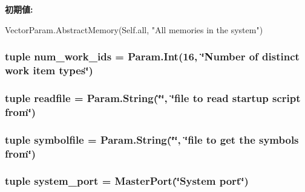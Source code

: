 \label{classSystem_1_1System_a0ebb0343c16ba35f99eb82a31a3abed7}
{\bfseries 初期値:}
\begin{DoxyCode}
VectorParam.AbstractMemory(Self.all,
                                          "All memories in the system")
\end{DoxyCode}
\hypertarget{classSystem_1_1System_a505fd78bb6593c92f840f452741a8c42}{
\subsubsection[{num\_\-work\_\-ids}]{\setlength{\rightskip}{0pt plus 5cm}tuple {\bf num\_\-work\_\-ids} = Param.Int(16, \char`\"{}Number of distinct work item types\char`\"{})}}
\label{classSystem_1_1System_a505fd78bb6593c92f840f452741a8c42}
\hypertarget{classSystem_1_1System_ab23383105beaef5f4d64f2ff0ef7f24c}{
\subsubsection[{readfile}]{\setlength{\rightskip}{0pt plus 5cm}tuple {\bf readfile} = Param.String(\char`\"{}\char`\"{}, \char`\"{}file to read startup script from\char`\"{})}}
\label{classSystem_1_1System_ab23383105beaef5f4d64f2ff0ef7f24c}
\hypertarget{classSystem_1_1System_a3001ef045b814fad6b1b3121c55bf301}{
\subsubsection[{symbolfile}]{\setlength{\rightskip}{0pt plus 5cm}tuple {\bf symbolfile} = Param.String(\char`\"{}\char`\"{}, \char`\"{}file to get the symbols from\char`\"{})}}
\label{classSystem_1_1System_a3001ef045b814fad6b1b3121c55bf301}
\hypertarget{classSystem_1_1System_ac1b872638c5b453dbc59423eb0e07188}{
\subsubsection[{system\_\-port}]{\setlength{\rightskip}{0pt plus 5cm}tuple {\bf system\_\-port} = {\bf MasterPort}(\char`\"{}System port\char`\"{})}}
